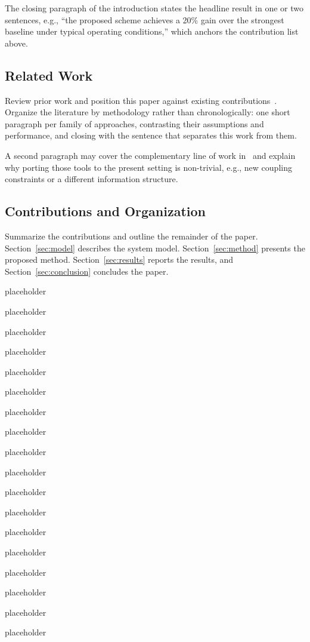 \documentclass[conference]{IEEEtran}
\begin{document}
The closing paragraph of the introduction states the headline result in one or two sentences, e.g., ``the proposed scheme achieves a 20\% gain over the strongest baseline under typical operating conditions,'' which anchors the contribution list above.

\subsection{Related Work}
Review prior work and position this paper against existing contributions~\cite{ref_shannon1948, ref_boyd2004}. Organize the literature by methodology rather than chronologically: one short paragraph per family of approaches, contrasting their assumptions and performance, and closing with the sentence that separates this work from them.

A second paragraph may cover the complementary line of work in~\cite{ref_boyd2004} and explain why porting those tools to the present setting is non-trivial, e.g., new coupling constraints or a different information structure.

\subsection{Contributions and Organization}
Summarize the contributions and outline the remainder of the paper. Section~\ref{sec:model} describes the system model. Section~\ref{sec:method} presents the proposed method. Section~\ref{sec:results} reports the results, and Section~\ref{sec:conclusion} concludes the paper.

placeholder

placeholder

placeholder

placeholder

placeholder

placeholder

placeholder

placeholder

placeholder

placeholder

placeholder

placeholder

placeholder

placeholder

placeholder

placeholder

placeholder

placeholder
\end{document}
